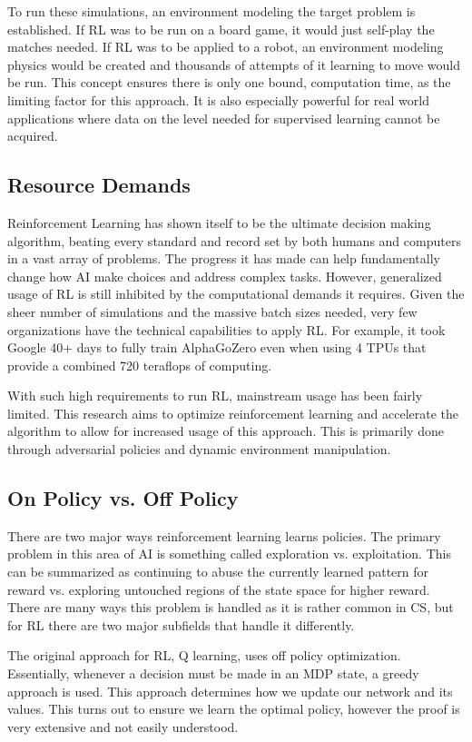 \documentclass{article}
\begin{document}
To run these simulations, an environment modeling the target problem is established. If RL was to be run on a board game, it would just self-play the matches needed. If RL was to be applied to a robot, an environment modeling physics would be created and thousands of attempts of it learning to move would be run. This concept ensures there is only one bound, computation time, as the limiting factor for this approach. It is also especially powerful for real world applications where data on the level needed for supervised learning cannot be acquired.

\subsection{Resource Demands}
Reinforcement Learning has shown itself to be the ultimate decision making algorithm, beating every standard and record set by both humans and computers in a vast array of problems. The progress it has made can help fundamentally change how AI make choices and address complex tasks. However, generalized usage of RL is still inhibited by the computational demands it requires. Given the sheer number of simulations and the massive batch sizes needed, very few organizations have the technical capabilities to apply RL. For example, it took Google 40+ days to fully train AlphaGoZero even when using 4 TPUs that provide a combined 720 teraflops of computing.

With such high requirements to run RL, mainstream usage has been fairly limited. This research aims to optimize reinforcement learning and accelerate the algorithm to allow for increased usage of this approach. This is primarily done through adversarial policies and dynamic environment manipulation.

\subsection{On Policy vs. Off Policy}
There are two major ways reinforcement learning learns policies. The primary problem in this area of AI is something called exploration vs. exploitation. This can be summarized as continuing to abuse the currently learned pattern for reward vs. exploring untouched regions of the state space for higher reward. There are many ways this problem is handled as it is rather common in CS, but for RL there are two major subfields that handle it differently.

The original approach for RL, Q learning, uses off policy optimization. Essentially, whenever a decision must be made in an MDP state, a greedy approach is used. This approach determines how we update our network and its values. This turns out to ensure we learn the optimal policy, however the proof is very extensive and not easily understood. 
\end{document}
